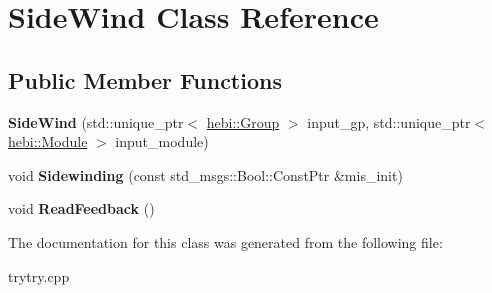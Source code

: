 \hypertarget{classSideWind}{}\section{Side\+Wind Class Reference}
\label{classSideWind}
\subsection*{Public Member Functions}
\begin{DoxyCompactItemize}
\item 
\mbox{\label{classSideWind_aa32584d09d0ce6f7c8db56a7fddcfba0}} 
{\bfseries Side\+Wind} (std\+::unique\+\_\+ptr$<$ \hyperlink{classhebi_1_1Group}{hebi\+::\+Group} $>$ input\+\_\+gp, std\+::unique\+\_\+ptr$<$ \hyperlink{classhebi_1_1Module}{hebi\+::\+Module} $>$ input\+\_\+module)
\item 
\mbox{\label{classSideWind_addb592f9e571ab41f00dee606377119f}} 
void {\bfseries Sidewinding} (const std\+\_\+msgs\+::\+Bool\+::\+Const\+Ptr \&mis\+\_\+init)
\item 
\mbox{\label{classSideWind_a5b28d72a4fb9cedb1418e52b895e58c7}} 
void {\bfseries Read\+Feedback} ()
\end{DoxyCompactItemize}


The documentation for this class was generated from the following file\+:\begin{DoxyCompactItemize}
\item 
trytry.\+cpp\end{DoxyCompactItemize}
